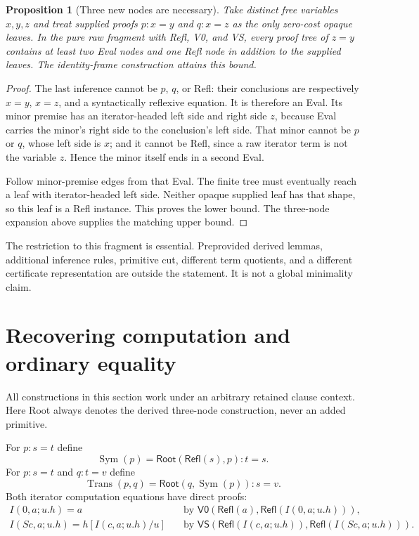 \documentclass[11pt,letterpaper]{article}
\newtheorem{proposition}[theorem]{Proposition}
\theoremstyle{definition}
\newcommand{\Refl}{\mathsf{Refl}}
\newcommand{\Root}{\mathsf{Root}}
\newcommand{\VZ}{\mathsf{V0}}
\newcommand{\VS}{\mathsf{VS}}
\begin{document}
\begin{proposition}[Three new nodes are necessary]
Take distinct free variables $x,y,z$ and treat supplied proofs
$p:x=y$ and $q:x=z$ as the only zero-cost opaque leaves. In the
pure raw fragment with Refl, V0, and VS, every proof tree of $z=y$
contains at least two Eval nodes and one Refl node in addition
to the supplied leaves. The identity-frame construction attains
this bound.
\end{proposition}
\begin{proof}
The last inference cannot be $p$, $q$, or Refl: their conclusions
are respectively $x=y$, $x=z$, and a syntactically reflexive
equation. It is therefore an Eval. Its minor premise has an
iterator-headed left side and right side $z$, because Eval
carries the minor's right side to the conclusion's left side.
That minor cannot be $p$ or $q$, whose left side is $x$; and it
cannot be Refl, since a raw iterator term is not the variable $z$.
Hence the minor itself ends in a second Eval.

Follow minor-premise edges from that Eval. The finite tree must
eventually reach a leaf with iterator-headed left side. Neither
opaque supplied leaf has that shape, so this leaf is a Refl
instance. This proves the lower bound. The three-node expansion
above supplies the matching upper bound.
\end{proof}
The restriction to this fragment is essential. Preprovided derived
lemmas, additional inference rules, primitive cut, different term
quotients, and a different certificate representation are outside
the statement. It is not a global minimality claim.

\section{Recovering computation and ordinary equality}
\label{sec:equality}

All constructions in this section work under an arbitrary retained
clause context. Here Root always denotes the derived three-node
construction, never an added primitive.

For $p:s=t$ define
\[
 \operatorname{Sym}(p)=\Root(\Refl(s),p):t=s.
\]
For $p:s=t$ and $q:t=v$ define
\[
 \operatorname{Trans}(p,q)=\Root(q,\operatorname{Sym}(p)):s=v.
\]
Both iterator computation equations have direct proofs:
\begin{align*}
 I(0,a;u.h)=a
    &\quad\text{by }\VZ(\Refl(a),\Refl(I(0,a;u.h))),\\
 I(Sc,a;u.h)=h[I(c,a;u.h)/u]
    &\quad\text{by }\VS(\Refl(I(c,a;u.h)),
                             \Refl(I(Sc,a;u.h))).
\end{align*}
\end{document}
